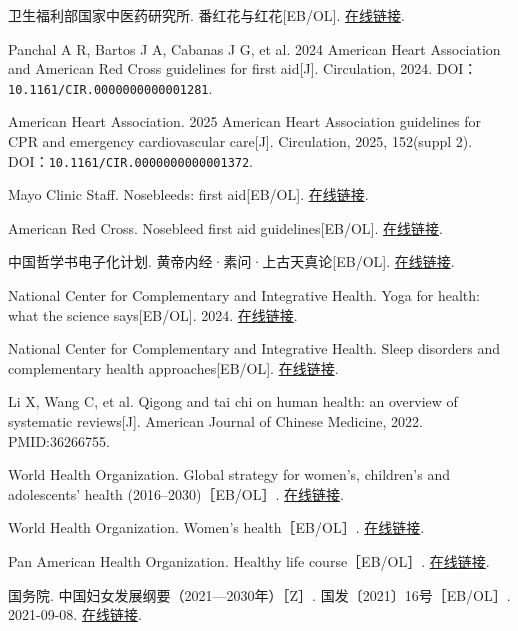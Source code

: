 \begin{enumerate}[label={[Q\arabic*]},leftmargin=*]
  \item 卫生福利部国家中医药研究所. 番红花与红花[EB/OL]. \href{https://www.nricm.edu.tw/p/404-1000-5146.php?Lang=zh-tw}{在线链接}.
  \item Panchal A R, Bartos J A, Cabanas J G, et al. 2024 American Heart Association and American Red Cross guidelines for first aid[J]. Circulation, 2024. DOI：\nolinkurl{10.1161/CIR.0000000000001281}.
  \item American Heart Association. 2025 American Heart Association guidelines for CPR and emergency cardiovascular care[J]. Circulation, 2025, 152(suppl 2). DOI：\nolinkurl{10.1161/CIR.0000000000001372}.
  \item Mayo Clinic Staff. Nosebleeds: first aid[EB/OL]. \href{https://www.mayoclinic.org/first-aid/first-aid-nosebleeds/basics/art-20056683}{在线链接}.
  \item American Red Cross. Nosebleed first aid guidelines[EB/OL]. \href{https://www.redcross.org/take-a-class/resources/guidelines}{在线链接}.
  \item 中国哲学书电子化计划. 黄帝内经·素问·上古天真论[EB/OL]. \href{https://ctext.org/huangdi-neijing/shang-gu-tian-zhen-lun/zhs}{在线链接}.
  \item National Center for Complementary and Integrative Health. Yoga for health: what the science says[EB/OL]. 2024. \href{https://www.nccih.nih.gov/health/providers/digest/yoga-for-health-science}{在线链接}.
  \item National Center for Complementary and Integrative Health. Sleep disorders and complementary health approaches[EB/OL]. \href{https://www.nccih.nih.gov/health/sleep-disorders-and-complementary-health-approaches}{在线链接}.
  \item Li X, Wang C, et al. Qigong and tai chi on human health: an overview of systematic reviews[J]. American Journal of Chinese Medicine, 2022. PMID:36266755.
  \item World Health Organization. Global strategy for women’s, children’s and adolescents’ health (2016–2030)［EB/OL］. \href{https://platform.who.int/data/maternal-newborn-child-adolescent-ageing/global-strategy-data}{在线链接}.
  \item World Health Organization. Women’s health［EB/OL］. \href{https://www.who.int/health-topics/women-s-health}{在线链接}.
  \item Pan American Health Organization. Healthy life course［EB/OL］. \href{https://www.paho.org/en/topics/healthy-life-course}{在线链接}.
  \item 国务院. 中国妇女发展纲要（2021—2030年）［Z］. 国发〔2021〕16号［EB/OL］. 2021-09-08. \href{https://www.mee.gov.cn/zcwj/gwywj/202109/t20210927_954260.shtml}{在线链接}.

\end{enumerate}
